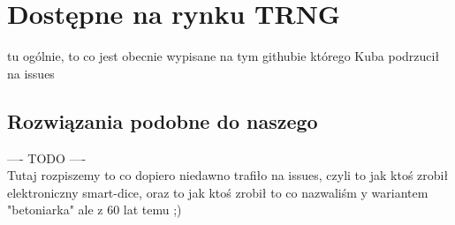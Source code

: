 \section{Dostępne na rynku TRNG}\label{sec:dostepne-na-rynku-trng}

tu ogólnie, to co jest obecnie wypisane na tym githubie którego Kuba podrzucił na issues

\subsection{Rozwiązania podobne do naszego}
    ---- TODO ---- \\

Tutaj rozpiszemy to co dopiero niedawno trafiło na issues, czyli to jak ktoś zrobił elektroniczny smart-dice,
oraz to jak ktoś zrobił to co nazwaliśm y wariantem "betoniarka" ale z 60 lat temu ;)